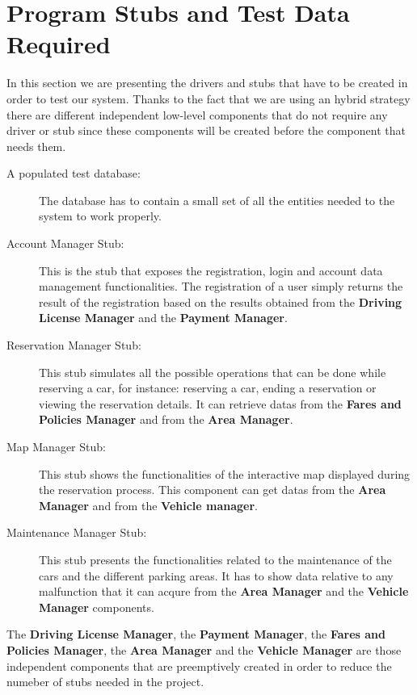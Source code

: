 \section{Program Stubs and Test Data Required}

In this section we are presenting the drivers and stubs that have to be created
in order to test our system.
Thanks to the fact that we are using an hybrid strategy there are different
independent low-level components that do not require any driver or stub since
these components will be created before the component that needs them.

\begin{description}

\item[A populated test database:] The database has to contain a small set of
all the entities needed to the system to work properly.

\item[Account Manager Stub:] This is the stub that exposes the registration,
login and account data management functionalities. The registration of a user
simply returns the result of the registration based on the results obtained from
the \textbf{Driving License Manager} and the \textbf{Payment Manager}.

\item[Reservation Manager Stub:] This stub simulates all the possible operations
that can be done while reserving a car, for instance: reserving a car, ending a
reservation or viewing the reservation details. It can retrieve datas from the
\textbf{Fares and Policies Manager} and from the \textbf{Area Manager}.

\item[Map Manager Stub:] This stub shows the functionalities of the interactive
map displayed during the reservation process. This component can get datas from
the \textbf{Area Manager} and from the \textbf{Vehicle manager}.

\item[Maintenance Manager Stub:] This stub presents the functionalities related
to the maintenance of the cars and the different parking areas. It has to show
data relative to any malfunction that it can acqure from the
\textbf{Area Manager} and the \textbf{Vehicle Manager} components.

\end{description}

The \textbf{Driving License Manager}, the \textbf{Payment Manager}, the
\textbf{Fares and Policies Manager}, the \textbf{Area Manager} and the
\textbf{Vehicle Manager} are those independent components that are preemptively
created in order to reduce the numeber of stubs needed in the project.
